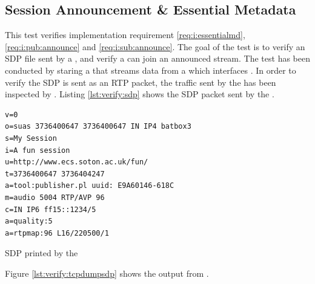 \subsection{Session Announcement \& Essential Metadata} \label{sec:verify:sessionannouncement}
This test verifies implementation requirement \ref{req:i:essentialmd}, \ref{req:i:pub:announce} and \ref{req:i:sub:announce}. The goal of the test is to verify an SDP file sent by a \pub{}, and verify a \sub{} can join an announced stream.
The test has been conducted by staring a \pub{} that streams data from a \con{} which interfaces . In order to verify the SDP is sent as an RTP packet, the traffic sent by the \pub{} has been inspected by . Listing \ref{lst:verify:sdp} shows the SDP packet sent by the \pub{}.

\begin{listing}[H] 
\begin{verbatim}
v=0
o=suas 3736400647 3736400647 IN IP4 batbox3
s=My Session
i=A fun session
u=http://www.ecs.soton.ac.uk/fun/
t=3736400647 3736404247
a=tool:publisher.pl uuid: E9A60146-618C
m=audio 5004 RTP/AVP 96
c=IN IP6 ff15::1234/5
a=quality:5
a=rtpmap:96 L16/220500/1
\end{verbatim}
\caption{SDP printed by the \pub{}}
\label{lst:verify:sdp}
\end{listing}

Figure \ref{lst:verify:tcpdumpsdp} shows the output from .

